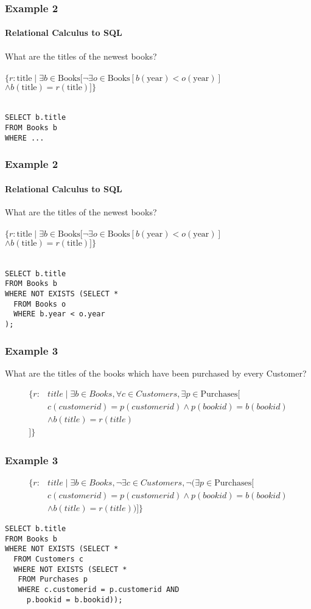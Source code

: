 \documentclass{beamer}
\begin{document}
\begin{frame}[fragile]
  \frametitle{Example 2}
    \framesubtitle{Relational Calculus to SQL}
  What are the titles of the newest books?\\
  \hfill \\
  $\{r:\text{title} \mid \exists b \in \text{Books} [ \neg\exists o \in \text{Books} [ b(\text{year}) < o(\text{year})]$\\
  $\land b(\text{title}) = r(\text{title})] \}$\\
  \hfill \\
\begin{lstlisting}
SELECT b.title
FROM Books b
WHERE ...
\end{lstlisting}
\end{frame}

\begin{frame}[fragile]
  \frametitle{Example 2}
    \framesubtitle{Relational Calculus to SQL}
  What are the titles of the newest books?\\
  \hfill \\
  $\{r:\text{title} \mid \exists b \in \text{Books} [ \neg\exists o \in \text{Books} [ b(\text{year}) < o(\text{year})]$\\
  $\land b(\text{title}) = r(\text{title})] \}$\\
  \hfill \\
\begin{lstlisting}
SELECT b.title
FROM Books b
WHERE NOT EXISTS (SELECT *
  FROM Books o
  WHERE b.year < o.year
);
\end{lstlisting}
\end{frame}

\begin{frame}[fragile]
\frametitle{Example 3}
What are the titles of the books which have been purchased by every Customer?

\begin{align*}
\{r:&title \mid \exists b \in Books, \forall c \in Customers, \exists p \in \text{Purchases} [\\
  &c(customerid) = p(customerid) \land  p(bookid) = b(bookid) \\
  &\land b(title) = r(title)\\
]\}
\end{align*}

\end{frame}

\begin{frame}[fragile]
\frametitle{Example 3}
\begin{align*}
\{r:&title \mid \exists b \in Books, \neg \exists c \in Customers, \neg \big(\exists p \in \text{Purchases} [\\
  &c(customerid) = p(customerid) \land  p(bookid) = b(bookid) \\
  &\land b(title) = r(title)\big)]\}
\end{align*}
\begin{lstlisting}
SELECT b.title
FROM Books b
WHERE NOT EXISTS (SELECT *
  FROM Customers c
  WHERE NOT EXISTS (SELECT *
   FROM Purchases p
   WHERE c.customerid = p.customerid AND
     p.bookid = b.bookid));
\end{lstlisting}
\end{frame}
\end{document}
